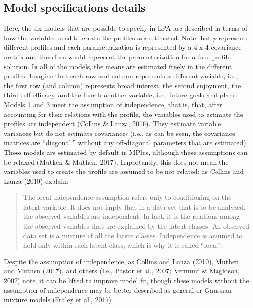 \documentclass[]{book}
\theoremstyle{definition}
\theoremstyle{definition}
\theoremstyle{definition}
\theoremstyle{remark}
\begin{document}
\subsection{Model specifications
details}\label{model-specifications-details}

Here, the six models that are possible to specify in LPA are described
in terms of how the variables used to create the profiles are estimated.
Note that \emph{p} represents different profiles and each
parameterization is represented by a 4 x 4 covariance matrix and
therefore would represent the parameterization for a four-profile
solution. In all of the models, the means are estimated freely in the
different profiles. Imagine that each row and column represents a
different variable, i.e., the first row (and column) represents broad
interest, the second enjoyment, the third self-efficacy, and the fourth
another variable, i.e., future goals and plans. Models 1 and 3 meet the
assumption of independence, that is, that, after accounting for their
relations with the profile, the variables used to estimate the profiles
are independent (Collins \& Lanza, 2010). They estimate variable
variances but do not estimate covariances (i.e., as can be seen, the
covariance matrices are ``diagonal,'' without any off-diagonal
parameters that are estimated). These models are estimated by default in
MPlus, although these assumptions can be relaxed (Muthen \& Muthen,
2017). Importantly, this does not mean the variables used to create the
profile are assumed to be not related; as Collins and Lanza (2010)
explain:

\begin{quote}
The local independence assumption refers only to conditioning on the
latent variable. It does not imply that in a data set that is to be
analyzed, the observed variables are independent. In fact, it is the
relations among the observed variables that are explained by the latent
classes. An observed data set is a mixture of all the latent classes.
Independence is assumed to hold only within each latent class, which is
why it is called ``local''.
\end{quote}

Despite the assumption of independence, as Collins and Lanza (2010),
Muthen and Muthen (2017), and others (i.e., Pastor et al., 2007; Vermunt
\& Magidson, 2002) note, it can be lifted to improve model fit, though
these models without the assumption of independence may be better
described as general or Gaussian mixture models (Fraley et al., 2017).
\end{document}
